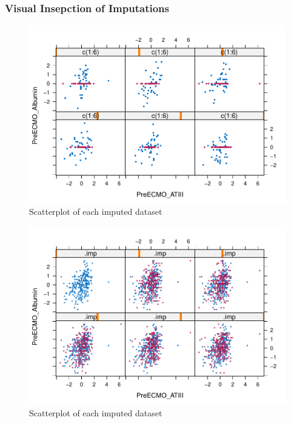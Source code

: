 \documentclass[12pt,]{article}
\begin{document}
\subsubsection{Visual Insepction of
Imputations}\label{visual-insepction-of-imputations}

\begin{figure}[H]

{\centering \includegraphics[width=1\linewidth]{figure/graphics-unnamed-chunk-18-1} 

}

\caption{\label{fig:xyplot-mean}Scatterplot of each imputed dataset}\label{fig:unnamed-chunk-18}
\end{figure}

\begin{figure}[H]

{\centering \includegraphics[width=1\linewidth]{figure/graphics-unnamed-chunk-19-1} 

}

\caption{\label{fig:xyplot-mean}Scatterplot of each imputed dataset}\label{fig:unnamed-chunk-19}
\end{figure}
\end{document}
